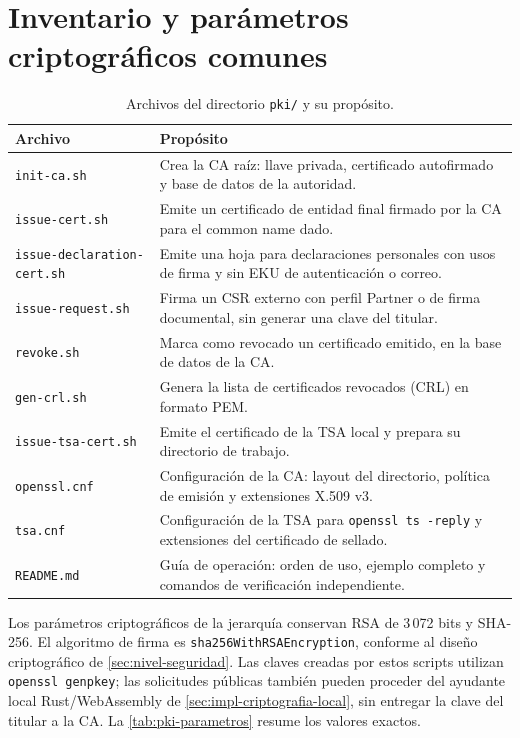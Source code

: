 \section{Inventario y parámetros criptográficos comunes}\label{sec:pki-inventario}

\begin{table}[H]
  \centering
  \caption{Archivos del directorio \texttt{pki/} y su propósito.}
  \label{tab:pki-inventario}
  \begin{tabularx}{\linewidth}{@{}l X@{}}
    \toprule
    \textbf{Archivo} & \textbf{Propósito} \\
    \midrule
    \texttt{init-ca.sh} & Crea la CA raíz: llave privada, certificado autofirmado y base de datos de la autoridad. \\
    \texttt{issue-cert.sh} & Emite un certificado de entidad final firmado por la CA para el common name dado. \\
    \texttt{issue-declaration-cert.sh} & Emite una hoja para declaraciones personales con usos de firma y sin EKU de autenticación o correo. \\
    \texttt{issue-request.sh} & Firma un CSR externo con perfil Partner o de firma documental, sin generar una clave del titular. \\
    \texttt{revoke.sh} & Marca como revocado un certificado emitido, en la base de datos de la CA. \\
    \texttt{gen-crl.sh} & Genera la lista de certificados revocados (CRL) en formato PEM. \\
    \texttt{issue-tsa-cert.sh} & Emite el certificado de la TSA local y prepara su directorio de trabajo. \\
    \texttt{openssl.cnf} & Configuración de la CA: layout del directorio, política de emisión y extensiones X.509 v3. \\
    \texttt{tsa.cnf} & Configuración de la TSA para \texttt{openssl ts -reply} y extensiones del certificado de sellado. \\
    \texttt{README.md} & Guía de operación: orden de uso, ejemplo completo y comandos de verificación independiente. \\
    \bottomrule
  \end{tabularx}
\end{table}

Los par\'ametros criptogr\'aficos de la jerarqu\'ia conservan RSA de 3\,072 bits
y SHA-256. El algoritmo de firma es \texttt{sha256WithRSA\allowbreak Encryption},
conforme al dise\~no criptogr\'afico de \cref{sec:nivel-seguridad}. Las claves
creadas por estos scripts utilizan \texttt{openssl genpkey}; las solicitudes
p\'ublicas tambi\'en pueden proceder del ayudante local Rust/WebAssembly de
\cref{sec:impl-criptografia-local}, sin entregar la clave del titular a la CA.
La \cref{tab:pki-parametros} resume los valores exactos.

